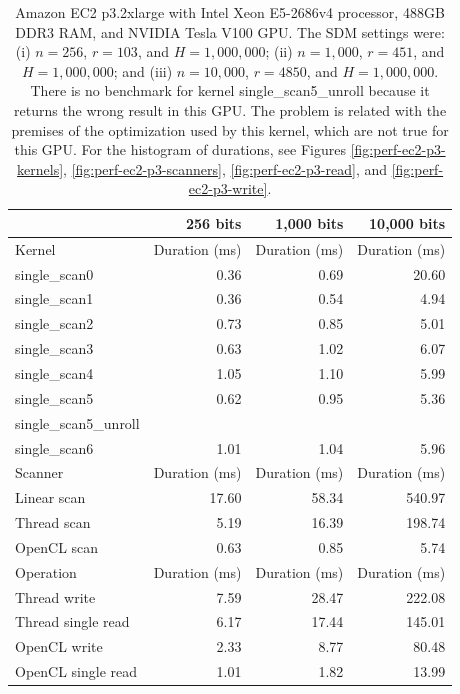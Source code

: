 



\begin{table}[!htb]
\centering
\begin{tabular}{lrrr}
    \toprule
    & \textbf{256 bits} & \textbf{1,000 bits} & \textbf{10,000 bits} \\ \hline
	\hline
	Kernel & Duration (ms) & Duration (ms) & Duration (ms) \\ \hline
    \hline
    single\_scan0 & 0.36 & 0.69 & 20.60 \\
    single\_scan1 & 0.36 & 0.54 &  4.94 \\
    single\_scan2 & 0.73 & 0.85 &  5.01 \\
    single\_scan3 & 0.63 & 1.02 &  6.07 \\
    single\_scan4 & 1.05 & 1.10 &  5.99 \\
    single\_scan5 & 0.62 & 0.95 &  5.36 \\
	single\_scan5\_unroll & & & \\
    single\_scan6 & 1.01 & 1.04 &  5.96 \\ \hline
    \hline
	Scanner & Duration (ms) & Duration (ms) & Duration (ms) \\ \hline
    Linear scan & 17.60 & 58.34 & 540.97 \\
    Thread scan &  5.19 & 16.39 & 198.74 \\
    OpenCL scan &  0.63 &  0.85 &   5.74 \\ \hline
    \hline
	Operation & Duration (ms) & Duration (ms) & Duration (ms) \\ \hline
    Thread write       & 7.59 & 28.47 & 222.08 \\
    Thread single read & 6.17 & 17.44 & 145.01 \\
    OpenCL write       & 2.33 &  8.77 &  80.48 \\
    OpenCL single read & 1.01 &  1.82 &  13.99 \\
    \hline
\end{tabular}
\caption{Amazon EC2 p3.2xlarge with Intel Xeon E5-2686v4 processor, 488GB DDR3 RAM, and NVIDIA Tesla V100 GPU. The SDM settings were: (i) $n=256$, $r=103$, and $H=1,000,000$; (ii) $n=1,000$, $r=451$, and $H=1,000,000$; and (iii) $n=10,000$, $r=4850$, and $H=1,000,000$. There is no benchmark for kernel single\_scan5\_unroll because it returns the wrong result in this GPU. The problem is related with the premises of the optimization used by this kernel, which are not true for this GPU.
For the histogram of durations, see Figures \ref{fig:perf-ec2-p3-kernels}, \ref{fig:perf-ec2-p3-scanners}, \ref{fig:perf-ec2-p3-read}, and \ref{fig:perf-ec2-p3-write}.
\label{tab:perf-ec2-p3}}
\end{table}





